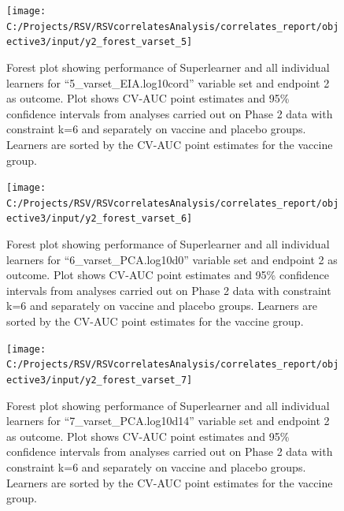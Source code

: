 \documentclass[11pt]{article}
\begin{document}
\begin{figure}[H]

{\centering \texttt{[image: C:/Projects/RSV/RSVcorrelatesAnalysis/correlates\_report/objective3/input/y2\_forest\_varset\_5]} 

}

\caption[Forest plot for ``5\_varset\_EIA.log10cord'' variable set, endpoint 2.]{Forest plot showing performance of Superlearner and all individual learners for ``5\_varset\_EIA.log10cord'' variable set and endpoint 2 as outcome. Plot shows CV-AUC point estimates and 95\% confidence intervals from analyses carried out on Phase 2 data with constraint k=6 and separately on vaccine and placebo groups. Learners are sorted by the CV-AUC point estimates for the vaccine group.}\label{fig:y2-forest-varset-5}
\end{figure}

\begin{figure}[H]

{\centering \texttt{[image: C:/Projects/RSV/RSVcorrelatesAnalysis/correlates\_report/objective3/input/y2\_forest\_varset\_6]} 

}

\caption[Forest plot for ``6\_varset\_PCA.log10d0'' variable set, endpoint 2.]{Forest plot showing performance of Superlearner and all individual learners for ``6\_varset\_PCA.log10d0'' variable set and endpoint 2 as outcome. Plot shows CV-AUC point estimates and 95\% confidence intervals from analyses carried out on Phase 2 data with constraint k=6 and separately on vaccine and placebo groups. Learners are sorted by the CV-AUC point estimates for the vaccine group.}\label{fig:y2-forest-varset-6}
\end{figure}

\begin{figure}[H]

{\centering \texttt{[image: C:/Projects/RSV/RSVcorrelatesAnalysis/correlates\_report/objective3/input/y2\_forest\_varset\_7]} 

}

\caption[Forest plot for ``7\_varset\_PCA.log10d14'' variable set, endpoint 2.]{Forest plot showing performance of Superlearner and all individual learners for ``7\_varset\_PCA.log10d14'' variable set and endpoint 2 as outcome. Plot shows CV-AUC point estimates and 95\% confidence intervals from analyses carried out on Phase 2 data with constraint k=6 and separately on vaccine and placebo groups. Learners are sorted by the CV-AUC point estimates for the vaccine group.}\label{fig:y2-forest-varset-7}
\end{figure}
\end{document}
